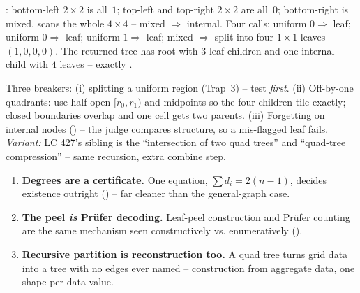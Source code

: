 \begin{tracebox}
: bottom-left $2\times2$ is all~$1$; top-left and top-right $2\times2$ are all~$0$;
bottom-right is mixed.  scans the whole $4\times4$ -- mixed $\Rightarrow$ internal.
Four calls:  uniform $0\Rightarrow$ leaf;  uniform $0\Rightarrow$
leaf;  uniform $1\Rightarrow$ leaf;  mixed $\Rightarrow$ split
into four $1\times1$ leaves $(1,0,0,0)$. The returned tree has root with $3$ leaf children and one
internal child with $4$ leaves -- exactly . \checkmark
\end{tracebox}


\begin{warningbox}
Three breakers: (i) splitting a uniform region (Trap~3) -- test \emph{first}. (ii) Off-by-one
quadrants: use half-open $[r_0,r_1)$ and midpoints so the four children tile exactly; closed
boundaries overlap and one cell gets two parents. (iii) Forgetting  on internal nodes
() -- the judge compares structure, so a mis-flagged leaf fails.
\emph{Variant:} LC 427's sibling is the ``intersection of two quad trees'' and ``quad-tree
compression'' -- same recursion, extra combine step.
\end{warningbox}

\begin{insightbox}
\begin{enumerate}[nosep, leftmargin=1.6em]
  \item \textbf{Degrees are a certificate.} One equation, $\sum d_i=2(n-1)$, decides existence
        outright () -- far cleaner than the general-graph case.
  \item \textbf{The peel \emph{is} Pr\"ufer decoding.} Leaf-peel construction and Pr\"ufer counting
        are the same mechanism seen constructively vs. enumeratively ().
  \item \textbf{Recursive partition is reconstruction too.} A quad tree turns grid data into a tree
        with no edges ever named -- construction from aggregate data, one shape per data value.
\end{enumerate}
\end{insightbox}

